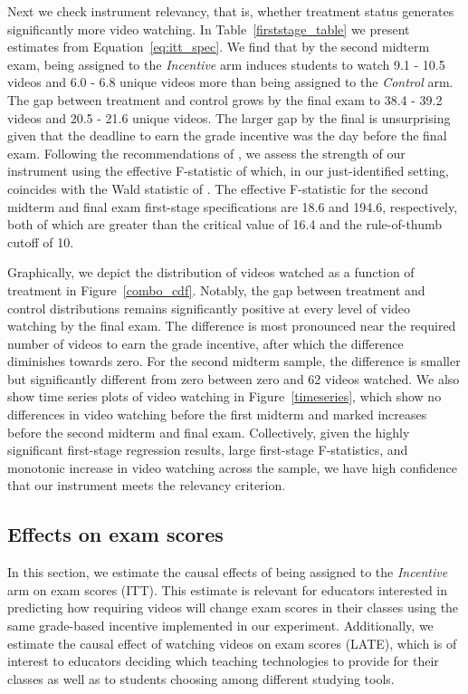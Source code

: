 \documentclass[12pt]{article}
\begin{document}
Next we check instrument relevancy, that is, whether treatment status generates significantly more video watching.
In Table~\ref{firststage_table} we present estimates from Equation~\ref{eq:itt_spec}.
We find that by the second midterm exam, being assigned to the \textit{Incentive} arm induces students to watch 9.1 - 10.5 videos and 6.0 - 6.8 unique videos more than being assigned to the \textit{Control} arm.
The gap between treatment and control grows by the final exam to 38.4 - 39.2 videos and 20.5 - 21.6 unique videos.
The larger gap by the final is unsurprising given that the deadline to earn the grade incentive was the day before the final exam.
Following the recommendations of \textcite{ass2019}, we assess the strength of our instrument using the effective F-statistic of \textcite{op2013} which, in our just-identified setting, coincides with the Wald statistic of \textcite{kp2006}.
The effective F-statistic for the second midterm and final exam first-stage specifications are 18.6 and 194.6, respectively, both of which are greater than the \textcite{sy2005} critical value of 16.4 and the rule-of-thumb cutoff of 10.

Graphically, we depict the distribution of videos watched as a function of treatment in Figure~\ref{combo_cdf}.
Notably, the gap between treatment and control distributions remains significantly positive at every level of video watching by the final exam.
The difference is most pronounced near the required number of videos to earn the grade incentive, after which the difference diminishes towards zero.
For the second midterm sample, the difference is smaller but significantly different from zero between zero and 62 videos watched.
We also show time series plots of video watching in Figure~\ref{timeseries}, which show no differences in video watching before the first midterm and marked increases before the second midterm and final exam.
Collectively, given the highly significant first-stage regression results, large first-stage F-statistics, and monotonic increase in video watching across the sample, we have high confidence that our instrument meets the relevancy criterion.

\subsection{Effects on exam scores}\label{subsec:effects}

In this section, we estimate the causal effects of being assigned to the \textit{Incentive} arm on exam scores (ITT).
This estimate is relevant for educators interested in predicting how requiring videos will change exam scores in their classes using the same grade-based incentive implemented in our experiment.
Additionally, we estimate the causal effect of watching videos on exam scores (LATE), which is of interest to educators deciding which teaching technologies to provide for their classes as well as to students choosing among different studying tools.
\end{document}
